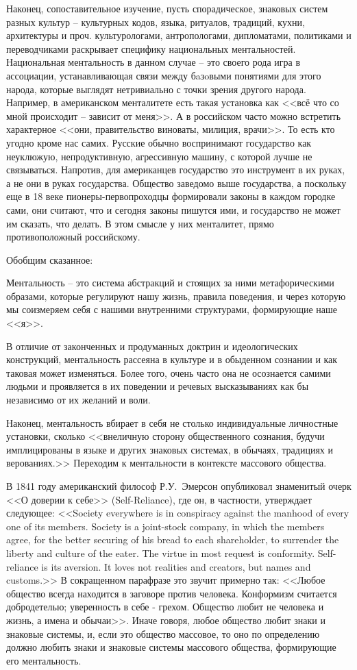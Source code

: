 Наконец, сопоставительное изучение, пусть спорадическое, знаковых систем разных культур -- культурных кодов,
языка, ритуалов, традиций, кухни, архитектуры и проч. культурологами, антропологами, дипломатами,
политиками и переводчиками раскрывает специфику национальных ментальностей. Национальная ментальность
в данном случае -- это своего рода игра в ассоциации, устанавливающая связи между бaзoвыми понятиями
для этого народа, которые выглядят нетривиально с точки зрения другого народа.
Например, в американском менталитете есть такая установка как <<всё что со мной происходит -- зависит от меня>>.
А в российском часто можно встретить характерное <<они, правительство виноваты, милиция, врачи>>.
То есть кто угодно кроме нас самих. Русские обычно воспринимают государство как неуклюжую, непродуктивную,
агрессивную машину, с которой лучше не связываться. Напротив, для американцев государство это инструмент в
их руках, а не они в руках государства. Общество заведомо выше государства, а поскольку еще в 18 веке
пионеры-первопроходцы формировали законы в каждом городке сами, они считают, что и сегодня законы пишутся
ими, и государство не может им сказать, что делать. В этом смысле у них менталитет, прямо
противоположный российскому.

Обобщим сказанное:

Ментальность -- это система абстракций и стоящих за ними метафорическими образами,
которые регулируют нашу жизнь, правила поведения, и через которую мы соизмеряем себя
с нашими внутренними структурами, формирующие наше <<я>>.

В отличие от законченных и продуманных доктрин и идеологических конструкций, ментальность
рассеяна в культуре и в обыденном сознании и как таковая может изменяться.
Более того, очень часто она не осознается самими людьми и проявляется в их поведении
и речевых высказываниях как бы независимо от их желаний и воли.

Наконец, ментальность вбирает в себя не столько индивидуальные личностные установки,
сколько <<внеличную сторону общественного сознания, будучи имплицированы в языке и
других знаковых системах, в обычаях, традициях и верованиях.>>\autocite{gurevich_history} Переходим к ментальности в контексте массового общества.

В 1841 году американский философ Р.У.~Эмерсон опубликовал знаменитый очерк <<О доверии к себе>> (Self-Reliance),
где он, в частности, утверждает следующее: <<Society everywhere is in conspiracy against the manhood of
every one of its members. Society is a joint-stock company, in which the members agree, for
the better securing of his bread to each shareholder, to surrender the liberty and culture of the eater.
The virtue in most request is conformity. Self-reliance is its aversion. It loves not realities and
creators, but names and customs.>>\autocite{emerson1972self} В сокращенном парафразе это звучит примерно
так: <<Любое общество всегда находится в заговоре против человека. Конформизм считается добродетелью;
уверенность в себе - грехом. Общество любит не человека и жизнь, а имена и обычаи>>. Иначе говоря,
любое общество любит знаки и знаковые системы, и, если это общество массовое, то оно по определению
должно любить знаки и знаковые системы массового общества, формирующие его ментальность. 

